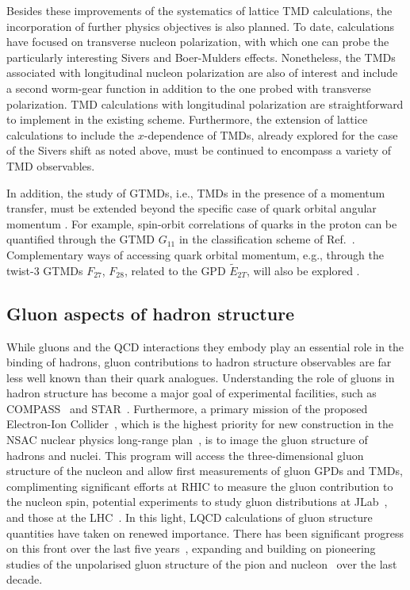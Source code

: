 Besides these improvements of the systematics of lattice TMD
calculations,  the incorporation of further physics objectives is
also planned. To date, calculations have focused on transverse nucleon
polarization, with which one can probe the particularly interesting
Sivers and Boer-Mulders effects. Nonetheless,  the TMDs associated
with longitudinal nucleon polarization are also of interest and include a
second worm-gear function in addition to the one probed with transverse
polarization. TMD calculations with longitudinal polarization are
straightforward to implement in the existing scheme. Furthermore, the
extension of lattice calculations to include the $x$-dependence of TMDs,
already explored for the case of the Sivers shift as noted above, must be
continued to encompass a variety of TMD observables.

In addition, the study of GTMDs, i.e., TMDs in the presence of a
momentum transfer, must be extended beyond the specific case of quark
orbital angular momentum \cite{Engelhardt:2017miy}. For example, spin-orbit correlations of quarks
in the proton can be quantified through the GTMD $G_{11} $ in the
classification scheme of Ref.~\cite{Meissner:2009ww}.
Complementary ways of accessing quark orbital
momentum, e.g., through the twist-3 GTMDs $F_{27} $, $F_{28} $, related
to the GPD $\widetilde{E}_{2T} $, will also be explored  \cite{Meissner:2009ww}.




\subsection{Gluon aspects of hadron structure}

While gluons and the QCD interactions they embody play an essential role in the binding of hadrons, gluon contributions to hadron structure observables are far less well known than their quark analogues. Understanding the role of gluons in hadron structure has become a major goal of experimental facilities, such as COMPASS~\cite{Adare:2014hsq} and STAR~\cite{Djawotho:2013pga}. Furthermore, a primary mission of the proposed Electron-Ion Collider~\cite{Accardi:2012qut,Kalantarians:2014eda}, which is the highest priority for new construction in the NSAC nuclear physics long-range plan~\cite{Geesaman:2015fha}, is to image the gluon structure of hadrons and nuclei. This program will access the three-dimensional gluon structure of the nucleon and allow first measurements of gluon GPDs and TMDs, complimenting significant efforts at RHIC to measure the gluon contribution to the nucleon spin,  potential experiments to study gluon distributions at JLab~\cite{Maxwell:2018gci,Hattawy:2017woc,Dobbs:2017vjw}, and those at the LHC~\cite{Baltz:2007kq}. 
%
In this light, LQCD calculations of gluon structure quantities have taken on renewed importance. There has been significant progress on this front over the last five years~\cite{Alexandrou:2017oeh,Yang:2016plb,Detmold:2016gpy,Detmold:2017oqb,Winter:2017bfs,Alexandrou:2016ekb}, expanding and building on pioneering studies of the unpolarised gluon structure of the pion and nucleon~\cite{Meyer:2007tm,Horsley:2012pz,Alexandrou:2013tfa,Deka:2013zha} over the last decade. 

